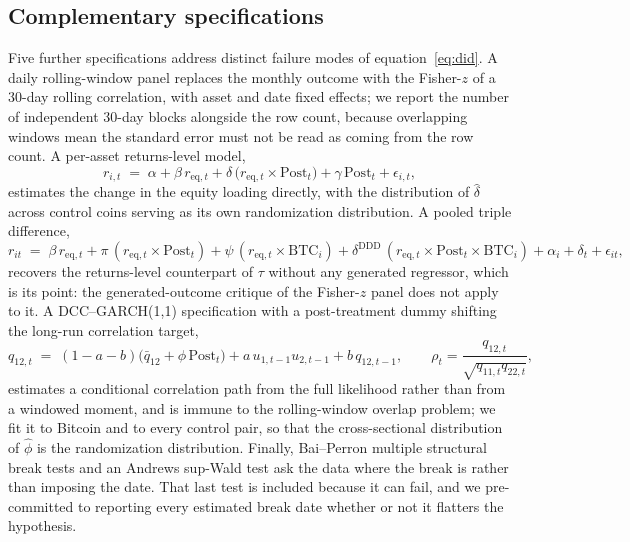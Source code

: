 \documentclass[12pt,a4paper]{article}
\begin{document}
\subsection{Complementary specifications}

Five further specifications address distinct failure modes of equation~\eqref{eq:did}. A daily rolling-window panel replaces the monthly outcome with the Fisher-$z$ of a 30-day rolling correlation, with asset and date fixed effects; we report the number of independent 30-day blocks alongside the row count, because overlapping windows mean the standard error must not be read as coming from the row count. A per-asset returns-level model,
\begin{equation}
r_{i,t} \;=\; \alpha + \beta\, r_{\mathrm{eq},t} + \delta\,\bigl(r_{\mathrm{eq},t}\times \mathrm{Post}_t\bigr) + \gamma\,\mathrm{Post}_t + \epsilon_{i,t},
\label{eq:interacted}
\end{equation}
estimates the change in the equity loading directly, with the distribution of $\hat\delta$ across control coins serving as its own randomization distribution. A pooled triple difference,
\begin{equation}
r_{it} \;=\; \beta\, r_{\mathrm{eq},t} + \pi\,(r_{\mathrm{eq},t}\times \mathrm{Post}_t) + \psi\,(r_{\mathrm{eq},t}\times \mathrm{BTC}_i) + \delta^{\mathrm{DDD}}\,(r_{\mathrm{eq},t}\times \mathrm{Post}_t \times \mathrm{BTC}_i) + \alpha_i + \delta_t + \epsilon_{it},
\label{eq:ddd}
\end{equation}
recovers the returns-level counterpart of $\tau$ without any generated regressor, which is its point: the generated-outcome critique of the Fisher-$z$ panel does not apply to it. A DCC--GARCH(1,1) specification with a post-treatment dummy shifting the long-run correlation target,
\begin{equation}
q_{12,t} \;=\; (1-a-b)\bigl(\bar q_{12} + \phi\,\mathrm{Post}_t\bigr) + a\,u_{1,t-1}u_{2,t-1} + b\,q_{12,t-1},
\qquad \rho_t = \frac{q_{12,t}}{\sqrt{q_{11,t}q_{22,t}}},
\label{eq:dcc}
\end{equation}
estimates a conditional correlation path from the full likelihood rather than from a windowed moment, and is immune to the rolling-window overlap problem; we fit it to Bitcoin and to every control pair, so that the cross-sectional distribution of $\hat\phi$ is the randomization distribution. Finally, Bai--Perron multiple structural break tests and an Andrews sup-Wald test ask the data where the break is rather than imposing the date. That last test is included because it can fail, and we pre-committed to reporting every estimated break date whether or not it flatters the hypothesis.
\end{document}
